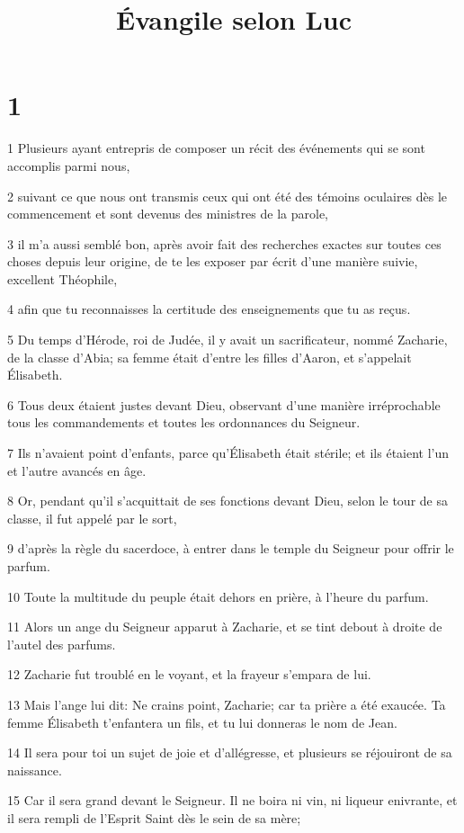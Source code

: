 

\title{Évangile selon Luc}


\chapter{1}

\par 1 Plusieurs ayant entrepris de composer un récit des événements qui se sont accomplis parmi nous,
\par 2 suivant ce que nous ont transmis ceux qui ont été des témoins oculaires dès le commencement et sont devenus des ministres de la parole,
\par 3 il m'a aussi semblé bon, après avoir fait des recherches exactes sur toutes ces choses depuis leur origine, de te les exposer par écrit d'une manière suivie, excellent Théophile,
\par 4 afin que tu reconnaisses la certitude des enseignements que tu as reçus.
\par 5 Du temps d'Hérode, roi de Judée, il y avait un sacrificateur, nommé Zacharie, de la classe d'Abia; sa femme était d'entre les filles d'Aaron, et s'appelait Élisabeth.
\par 6 Tous deux étaient justes devant Dieu, observant d'une manière irréprochable tous les commandements et toutes les ordonnances du Seigneur.
\par 7 Ils n'avaient point d'enfants, parce qu'Élisabeth était stérile; et ils étaient l'un et l'autre avancés en âge.
\par 8 Or, pendant qu'il s'acquittait de ses fonctions devant Dieu, selon le tour de sa classe, il fut appelé par le sort,
\par 9 d'après la règle du sacerdoce, à entrer dans le temple du Seigneur pour offrir le parfum.
\par 10 Toute la multitude du peuple était dehors en prière, à l'heure du parfum.
\par 11 Alors un ange du Seigneur apparut à Zacharie, et se tint debout à droite de l'autel des parfums.
\par 12 Zacharie fut troublé en le voyant, et la frayeur s'empara de lui.
\par 13 Mais l'ange lui dit: Ne crains point, Zacharie; car ta prière a été exaucée. Ta femme Élisabeth t'enfantera un fils, et tu lui donneras le nom de Jean.
\par 14 Il sera pour toi un sujet de joie et d'allégresse, et plusieurs se réjouiront de sa naissance.
\par 15 Car il sera grand devant le Seigneur. Il ne boira ni vin, ni liqueur enivrante, et il sera rempli de l'Esprit Saint dès le sein de sa mère;
